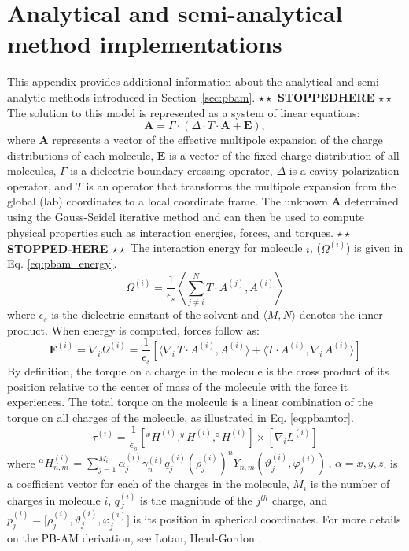 \documentclass[11pt,titlepage]{article}
\newcommand{\todo}[1]{\textbf{$\star \star$ {#1} $\star \star$}}
\begin{document}
\section{Analytical and semi-analytical method implementations} \label{app:pbam}
This appendix provides additional information about the analytical and semi-analytic methods introduced in Section~\ref{sec:pbam}.
\todo{STOPPEDHERE}
The solution to this model is represented as a system of linear equations:
\begin{equation} \label{eq:pbam_solve}
\mathbf{A} = \Gamma \cdot (\Delta \cdot T \cdot \mathbf{A} + \mathbf{E}),
\end{equation}
where \(\mathbf{A}\) represents a vector of the effective multipole expansion of the charge distributions of each molecule, \(\mathbf{E}\) is a vector of the fixed charge distribution of all molecules, \(\Gamma\) is a dielectric boundary-crossing operator, \(\Delta\) is a cavity polarization operator, and \(T\) is an operator that transforms the multipole expansion from the global (lab) coordinates to a local coordinate frame. 
The unknown \(\mathbf{A}\) determined using the Gauss-Seidel iterative method and can then be used to compute physical properties such as interaction energies, forces, and torques. \todo{STOPPED-HERE}
%
%
The interaction energy for molecule \(i\), ($\Omega^{(i)}$) is given in Eq. \ref{eq:pbam_energy}.
%
\begin{equation}\label{eq:pbam_energy}
\Omega^{(i)}=\frac{1}{\epsilon_s} \left \langle \sum_{j \ne i}^N  T \cdot A^{(j) } ,  A^{(i) } \right \rangle 
\end{equation}
%
where $\epsilon_s$ is the dielectric constant of the solvent and $\langle  M, N \rangle$ denotes the inner product. When energy is computed, forces follow as:
%
\begin{equation}\label{eq:pbam_force}
\textbf{F}^{(i)} = \nabla_i \Omega^{(i)}=\frac{1}{\epsilon_s} [ \langle \nabla_i \,T \cdot A^{(i) } ,  A^{(i) } \rangle +  \langle T \cdot A^{(i) } ,   \nabla_i \, A^{(i) } \rangle ]
\end{equation}
%
By definition, the torque on a charge in the molecule is the cross product of its position relative to the center of mass of the molecule with the force it experiences. The total torque on the molecule is a linear combination of the torque on all charges of the molecule, as illustrated in Eq. \ref{eq:pbamtor}.
%
\begin{equation}\label{eq:pbamtor}
\tau^{(i)} =  \frac{1}{\epsilon_s}\left [  ^xH^{(i)}, ^yH^{(i)}, ^zH^{(i)} \right] \times   \left [  \nabla_i L^{(i)} \right ]
\end{equation} 
%
where $^\alpha H_{n,m}^{(i)}  = \sum_{j=1}^{M_i} \alpha_{j}^{(i)} \gamma_n^{(i)} q_j^{(i)} (\rho_j^{(i)})^n Y_{n,m} (\vartheta_j^{(i)}, \varphi_j^{(i)}) \, , \, \alpha = x , y, z$, is a coefficient vector for each of the charges in the molecule, $M_i$ is the number of charges in molecule $i$, $q_J^{(i)}$ is the magnitude of the $j^{th}$ charge, and $p_j^{(i)}=\Big[\rho_j^{(i)},\vartheta_j^{(i)},\varphi_j^{(i)}\Big]$ is its position in spherical coordinates. For more details on the PB-AM derivation, see Lotan, Head-Gordon \cite{lotan2006}.
\end{document}
